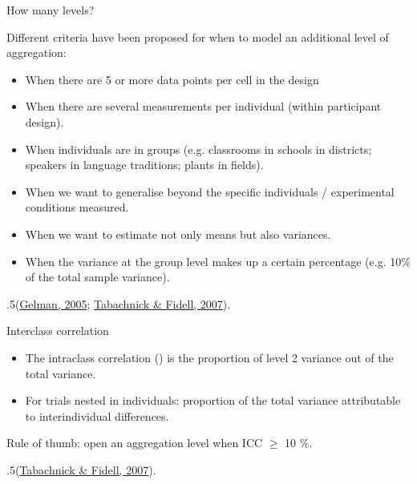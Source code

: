 \documentclass[ignorenonframetext,]{beamer}
\providecommand{\tightlist}{%
  \setlength{\itemsep}{0pt}\setlength{\parskip}{0pt}}
\begin{document}
%
\begin{frame}{\color{darkblue}How many levels?}

Different criteria have been proposed for when to model an additional level of aggregation: 

\begin{itemize}
\tightlist
\item When there are 5 or more data points per cell in the design
\item When there are several measurements per individual (within participant design).
\item When individuals are in groups (e.g. classrooms in schools in districts; speakers in language traditions; plants in fields).
\item When we want to generalise beyond the specific individuals / experimental conditions measured.
\item When we want to estimate not only means but also variances. 
\item When the variance at the group level makes up a certain percentage (e.g. 10\% of the total sample variance).
\end{itemize}

\par\begin{spacing}{.5}\begingroup\tiny (\href{https://arxiv.org/abs/math/0504499}{Gelman, 2005}; \href{https://www.pearson.com/en-us/subject-catalog/p/using-multivariate-statistics/P200000003097/9780137526543}{Tabachnick \& Fidell, 2007}).\endgroup\end{spacing}

\end{frame}

%
\begin{frame}[t,fragile]{\color{darkblue}Interclass correlation}
\vspace{1 cm}

\begin{itemize}
\tightlist
\item The intraclass correlation ({\color{teal}{ICC}}) is the proportion of level 2 variance out of the total variance. 
\pause
\item For trials nested in individuals: proportion of the total variance attributable to interindividual differences.  
\end{itemize}
 {\color{teal}{\[ICC =  \frac{\sigma^2_{level2}}{\sigma^2_{level1} + \sigma^2_{level2}} \]}}

 \pause
 
 \vspace{-.2cm}
 Rule of thumb: open an aggregation level when ICC $\geq$ 10 \%.
 
\par\begin{spacing}{.5}\begingroup\tiny(\href{https://www.pearson.com/en-us/subject-catalog/p/using-multivariate-statistics/P200000003097/9780137526543}{Tabachnick \& Fidell, 2007}).\endgroup\end{spacing}

\end{frame}
\end{document}
